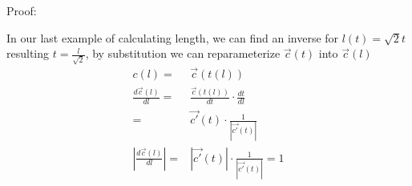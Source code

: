 \documentclass{article}
\begin{document}
        Proof:
        
        In our last example of calculating length, we can find an inverse for $l(t) = \sqrt{2}t$ resulting $t = \frac{l}{\sqrt{2}}$, by substitution we can reparameterize $\vec{c}(t)$ into $\vec{c}(l)$\\
        
        \begin{align}
            c(l) =& \vec{c}(t(l))\\
            \frac{d\vec{c}(l)}{dl} =& \frac{\vec{c}(t(l))}{dt}\cdot\frac{dt}{dl}\\
            =&\vec{c'}(t)\cdot\frac{1}{|\vec{c'}(t)|}\\
            |\frac{d\vec{c}(l)}{dl}|=&|\vec{c'}(t)|\cdot\frac{1}{|\vec{c'}(t)|}=1
        \end{align}
\end{document}
